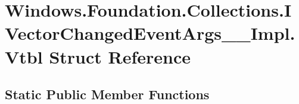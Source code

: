 \hypertarget{struct_windows_1_1_foundation_1_1_collections_1_1_i_vector_changed_event_args_____impl_1_1_vtbl}{}\section{Windows.\+Foundation.\+Collections.\+I\+Vector\+Changed\+Event\+Args\+\_\+\+\_\+\+Impl.\+Vtbl Struct Reference}
\label{struct_windows_1_1_foundation_1_1_collections_1_1_i_vector_changed_event_args_____impl_1_1_vtbl}
\subsection*{Static Public Member Functions}
